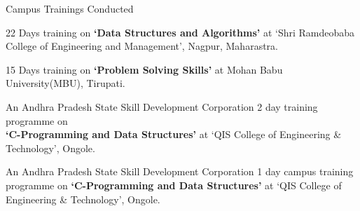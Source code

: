\documentclass{resume} %
\begin{document}
\begin{rSection}{Campus Trainings Conducted}
	
	\begin{rSubsection}{}{}{}{}	
		\item 22 Days training on \textbf{`Data Structures and Algorithms'} at `Shri Ramdeobaba College of Engineering and Management', Nagpur, Maharastra.
		\item 15 Days training on \textbf{`Problem Solving Skills'} at Mohan Babu University(MBU), Tirupati.
		\item An Andhra Pradesh State Skill Development Corporation 2 day training programme on \\ \textbf{`C-Programming and Data Structures'} at `QIS College of Engineering \& Technology', Ongole.
		\item An Andhra Pradesh State Skill Development Corporation 1 day campus training programme on \textbf{`C-Programming and
		Data Structures'} at `QIS College of Engineering \& Technology', Ongole.
	\end{rSubsection}
	
	
\end{rSection}
\end{document}
